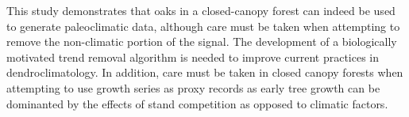 \documentclass[11pt]{article}
\begin{document}

This study demonstrates that oaks in a closed-canopy forest can indeed be used to generate paleoclimatic data, although care must be taken when attempting to remove the non-climatic portion of the signal. The development of a biologically motivated trend removal algorithm is needed to improve current practices in dendroclimatology. In addition, care must be taken in closed canopy forests when attempting to use growth series as proxy records as early tree growth can be dominanted by the effects of stand competition as opposed to climatic factors.   



\clearpage
\newpage


\clearpage
\newpage



\newpage
\clearpage


\end{document}
